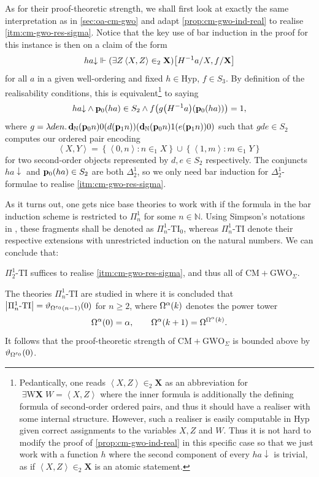 \documentclass[12pt,openany]{book}
\theoremstyle{plain}
\theoremstyle{definition}
\newcommand\tuple[1]{\left\langle #1 \right\rangle}
\newcommand\opE[1]{\mathop{\exists #1}}
\newcommand\oplam[1]{\mathop{\lambda #1.}}
\newcommand\TI{\text{-}\mathrm{TI}}
\newcommand\CM{\mathrm{CM}}
\newcommand\GWO{\mathrm{GWO}}
\newcommand\Hyp{\mathrm{Hyp}}
\newcommand\bp{\mathbf{p}}
\newcommand\bdN{\mathbf{d}_\mathbb{N}}
\begin{document}
As for their proof-theoretic strength, we shall first look at exactly the same interpretation as in \autoref{sec:oa-cm-gwo} and adapt \autoref{prop:cm-gwo-ind-real} to realise \ref{itm:cm-gwo-res-sigma}. Notice that the key use of bar induction in the proof for this instance is then on a claim of the form
\[ha {\downarrow} \Vdash \mleft(\opE{Z} \tuple{X, Z} \in_2 \mathbf{X}\mright)\mleft[H^{-1} a/X, f/\mathbf{X}\mright]\]
for all $a$ in a given well-ordering and fixed $h \in \Hyp$, $f \in S_3$. By definition of the realisability conditions, this is equivalent\footnote{Pedantically, one reads $\tuple{X, Z} \in_2 \mathbf{X}$ as an abbreviation for $\opE{W \in_2 \mathbf{X}} W = \tuple{X, Z}$ where the inner formula is additionally the defining formula of second-order ordered pairs, and thus it should have a realiser with some internal structure. However, such a realiser is easily computable in $\Hyp$ given correct assignments to the variables $X, Z$ and $W$. Thus it is not hard to modify the proof of \autoref{prop:cm-gwo-ind-real} in this specific case so that we just work with a function $h$ where the second component of every $ha {\downarrow}$ is trivial, as if $\tuple{X, Z} \in_2 \mathbf{X}$ is an atomic statement.} to saying
\[ha {\downarrow} \land \bp_0 \mleft(ha\mright) \in S_2 \land f \mleft(g \mleft(H^{-1} a\mright) \mleft(\bp_0 \mleft(ha\mright)\mright)\mright) = 1,\]
where $g = \oplam{den} \bdN \mleft(\bp_0 n\mright) 0 \mleft(d \mleft(\bp_1 n\mright)\mright) \mleft(\bdN \mleft(\bp_0 n\mright) 1 \mleft(e \mleft(\bp_1 n\mright)\mright) 0\mright)$ such that $gde \in S_2$ computes our ordered pair encoding
\[\tuple{X, Y} = \left\{\tuple{0, n} : n \in_1 X\right\} \cup \left\{\tuple{1, m} : m \in_1 Y\right\}\]
for two second-order objects represented by $d, e \in S_2$ respectively. The conjuncts $ha {\downarrow}$ and $\bp_0 \mleft(ha\mright) \in S_2$ are both $\Delta^1_2$, so we only need bar induction for $\Delta^1_2$-formulae to realise \ref{itm:cm-gwo-res-sigma}.

As it turns out, one gets nice base theories to work with if the formula in the bar induction scheme is restricted to $\Pi^1_n$ for some $n \in \mathbb{N}$. Using Simpson's notations in \cite{simpson09-soa}, these fragments shall be denoted as $\Pi^1_n\TI_0$, whereas $\Pi^1_n\TI$ denote their respective extensions with unrestricted induction on the natural numbers. We can conclude that:
\begin{proposition}
  $\Pi^1_2\TI$ suffices to realise \ref{itm:cm-gwo-res-sigma}, and thus all of $\CM + \GWO_\Sigma$.
\end{proposition}
The theories $\Pi^1_n\TI$ are studied in \cite{rathjen-weiermann93-kruskal-theorem} where it is concluded that $\left|\Pi^1_n\TI\right| = \vartheta_{\Omega^{\varepsilon_0}\mleft(n - 1\mright)}\mleft(0\mright)$ for $n \geq 2$, where $\Omega^\alpha\mleft(k\mright)$ denotes the power tower
\[\Omega^\alpha\mleft(0\mright) = \alpha, \qquad \Omega^\alpha\mleft(k + 1\mright) = \Omega^{\Omega^\alpha\mleft(k\mright)}.\]
It follows that the proof-theoretic strength of $\CM + \GWO_\Sigma$ is bounded above by $\vartheta_{\Omega^{\varepsilon_0}}\mleft(0\mright)$.
\end{document}
